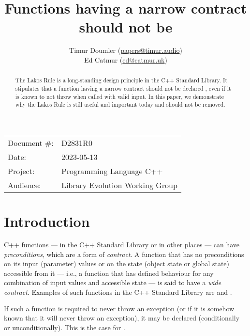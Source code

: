 


\title{Functions having a narrow contract should not be }
\author{ Timur Doumler \small(\href{mailto:papers@timur.audio}{papers@timur.audio})   \\
Ed Catmur \small(\href{mailto:ed@catmur.uk}{ed@catmur.uk})  }
\date{}
\maketitle

\begin{tabular}{ll}
Document \#: & D2831R0 \\
Date: &2023-05-13 \\
Project: & Programming Language C++ \\
Audience: & Library Evolution Working Group
\end{tabular}

\begin{abstract}
The Lakos Rule is a long-standing design principle in the C++ Standard Library. It stipulates that a function having a narrow contract should not be declared , even if it is known to not throw when called with valid input. In this paper, we demonstrate why the Lakos Rule is still useful and important today and should not be removed.
\end{abstract}

\section{Introduction}
\label{sec:intro}

C++ functions --- in the C++ Standard Library or in other places --- can have \emph{preconditions}, which are a form of \emph{contract}. A function that has no preconditions on its input (parameter) values or on the state (object state or global state) accessible from it --- i.e., a function that has defined behaviour for any combination of input values and accessible state --- is said to have a \emph{wide contract}. Examples of such functions in the C++ Standard Library are  and .

If such a function is required to never throw an exception (or if it is somehow known that it will never throw an exception), it may be declared  (conditionally or unconditionally). This is the case for .

